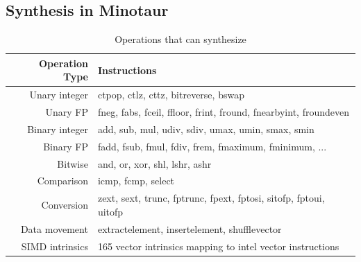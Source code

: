 \subsection{Synthesis in Minotaur}

\begin{table}[tbp]
  \centering
  \caption{Operations that \minotaur{} can synthesize}
  \begin{tabular}{ r | l }
    \textbf{Operation Type} & \textbf{Instructions} \\
    \hline
    Unary integer & ctpop, ctlz, cttz, bitreverse, bswap \\
    Unary FP & fneg, fabs, fceil, ffloor, frint, fround, fnearbyint, froundeven \\
    Binary integer & add, sub, mul, udiv, sdiv, umax, umin, smax, smin\\
    Binary FP & fadd, fsub, fmul, fdiv, frem, fmaximum, fminimum, ... \\
    Bitwise & and, or, xor, shl, lshr, ashr \\
    Comparison & icmp, fcmp, select \\
    Conversion & zext, sext, trunc, fptrunc, fpext, fptosi, sitofp, fptoui, uitofp \\
    Data movement & extractelement, insertelement, shufflevector \\
    SIMD intrinsics & 165 vector intrinsics mapping to intel vector instructions \\
  \end{tabular}
  \label{tab:operations}
\end{table}

